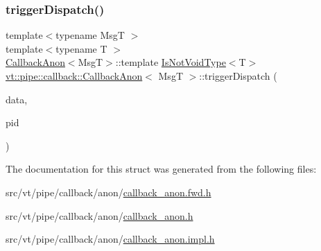 \subsubsection{\texorpdfstring{trigger\+Dispatch()}{triggerDispatch()}\hspace{0.1cm}{\footnotesize\ttfamily [2/2]}}
{\footnotesize\ttfamily template$<$typename MsgT $>$ \\
template$<$typename T $>$ \\
\hyperlink{structvt_1_1pipe_1_1callback_1_1_callback_anon}{Callback\+Anon}$<$MsgT$>$\+::template \hyperlink{structvt_1_1pipe_1_1callback_1_1_callback_anon_a91e58fe2f8165c826cecedde7e4535cf}{Is\+Not\+Void\+Type}$<$T$>$ \hyperlink{structvt_1_1pipe_1_1callback_1_1_callback_anon}{vt\+::pipe\+::callback\+::\+Callback\+Anon}$<$ MsgT $>$\+::trigger\+Dispatch (\begin{DoxyParamCaption}\item[{\hyperlink{structvt_1_1pipe_1_1callback_1_1_callback_anon_ac503b95feb44bb0b60c1d69e1ed29074}{Signal\+Data\+Type} $\ast$}]{data,  }\item[{\hyperlink{namespacevt_ac9852acda74d1896f48f406cd72c7bd3}{Pipe\+Type} const \&}]{pid }\end{DoxyParamCaption})}



The documentation for this struct was generated from the following files\+:\begin{DoxyCompactItemize}
\item 
src/vt/pipe/callback/anon/\hyperlink{callback__anon_8fwd_8h}{callback\+\_\+anon.\+fwd.\+h}\item 
src/vt/pipe/callback/anon/\hyperlink{callback__anon_8h}{callback\+\_\+anon.\+h}\item 
src/vt/pipe/callback/anon/\hyperlink{callback__anon_8impl_8h}{callback\+\_\+anon.\+impl.\+h}\end{DoxyCompactItemize}
